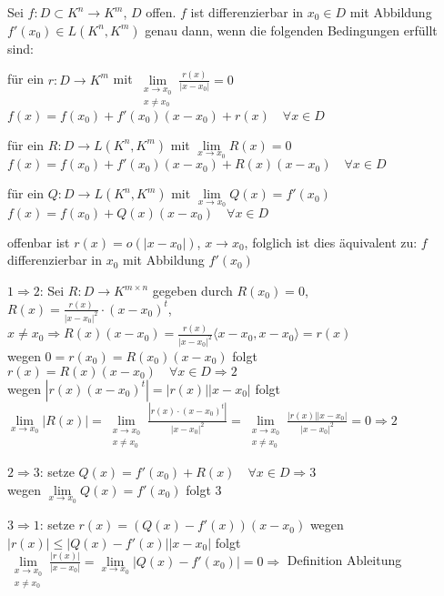 	\begin{satz}
		Sei $f:D\subset K^n \to K^m$, $D$ offen. $f$ ist differenzierbar in $x_0\in D$ mit Abbildung $f'(x_0)\in L(K^n,K^m)$ genau dann, wenn die folgenden Bedingungen erfüllt sind:
		\begin{compactitem}
			\item für ein $r:D\to K^m$ mit $\lim\limits_{\substack{x\to x_0 \\ x\neq x_0}} 
			\frac{r(x)}{|x-x_0|}=0$ \\
			$f(x)=f(x_0)+f'(x_0)(x-x_0)+r(x)\quad\forall x\in D$
			\item für ein $R:D\to L(K^n,K^m)$ mit $\lim\limits_{x\to x_0} R(x)=0$ \\
			$f(x)=f(x_0)+f'(x_0)(x-x_0)+R(x)(x-x_0)\quad\forall x\in D$
			\item für ein $Q:D\to L(K^n,K^m)$ mit $\lim\limits_{x\to x_0} Q(x)=f'(x_0)$ \\
			$f(x)=f(x_0)+Q(x)(x-x_0)\quad\forall x\in D$
		\end{compactitem}
	\end{satz}
	\begin{beweis}
		\begin{compactitem}
			\item offenbar ist $r(x)=o(|x-x_0|)$, $x\to x_0$, folglich ist dies äquivalent zu: $f$ 
			differenzierbar in $x_0$ mit Abbildung $f'(x_0)$
			\item $1\Rightarrow 2$: Sei $R:D\to K^{m\times n}$ gegeben durch $R(x_0)=0$, $R(x)=
			\frac{r(x)}{|x-x_0|^2}\cdot (x-x_0)^t$, $x\neq x_0 \Rightarrow R(x)(x-x_0)=\frac{r(x)}
			{|x-x_0|^2}\langle x-x_0,x-x_0\rangle=r(x)$ \\
			wegen $0=r(x_0)=R(x_0)(x-x_0)$ folgt $r(x)=R(x)(x-x_0)\quad\forall x\in D\Rightarrow 2$ \\
			wegen $|r(x)(x-x_0)^t|=|r(x)||x-x_0|$ folgt $\lim\limits_{x\to x_0} |R(x)|=\lim\limits_
			{\substack{x\to x_0 \\ x\neq x_0}} \frac{|r(x)\cdot (x-x_0)^t|}{|x-x_0|^2}=\lim\limits_
			{\substack{x\to x_0 \\ x\neq x_0}} \frac{|r(x)||x-x_0|}{|x-x_0|^2}=0\Rightarrow 2$
			\item $2\Rightarrow 3$: setze $Q(x)=f'(x_0)+R(x)\quad\forall x\in D\Rightarrow 3$ \\
			wegen $\lim\limits_{x\to x_0} Q(x)=f'(x_0)$ folgt 3
			\item $3\Rightarrow 1$: setze $r(x)=(Q(x)-f'(x))(x-x_0)$ wegen $|r(x)|\le |Q(x)-f'(x)||x-x_0|$ 
			folgt $\lim\limits_{\substack{x\to x_0 \\ x\neq x_0}} \frac{|r(x)|}{|x-x_0|}=\lim\limits_{x\to x_0} 
			|Q(x)-f'(x_0)|=0\Rightarrow$ Definition Ableitung
		\end{compactitem}
	\end{beweis}

